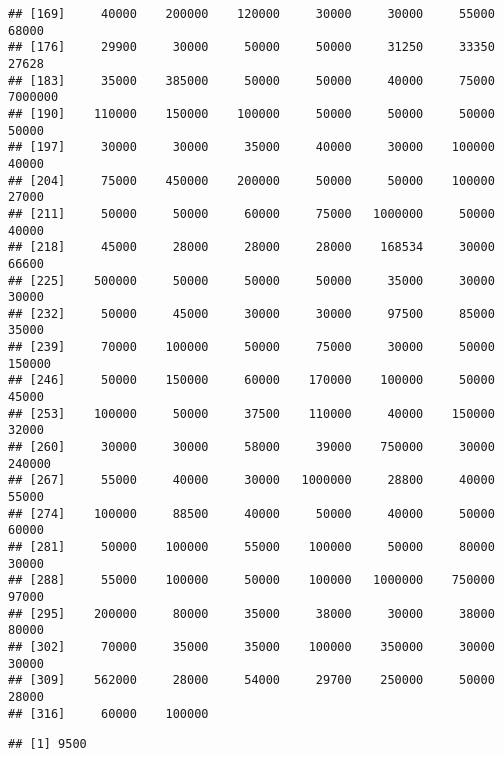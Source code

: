 \documentclass[
]{article}
\newenvironment{Shaded}{\begin{snugshade}}{\end{snugshade}}
\newcommand{\KeywordTok}[1]{\textcolor[rgb]{0.13,0.29,0.53}{\textbf{#1}}}
\newcommand{\NormalTok}[1]{#1}
\newcommand{\OperatorTok}[1]{\textcolor[rgb]{0.81,0.36,0.00}{\textbf{#1}}}
\begin{document}
\begin{verbatim}
## [169]     40000    200000    120000     30000     30000     55000     68000
## [176]     29900     30000     50000     50000     31250     33350     27628
## [183]     35000    385000     50000     50000     40000     75000   7000000
## [190]    110000    150000    100000     50000     50000     50000     50000
## [197]     30000     30000     35000     40000     30000    100000     40000
## [204]     75000    450000    200000     50000     50000    100000     27000
## [211]     50000     50000     60000     75000   1000000     50000     40000
## [218]     45000     28000     28000     28000    168534     30000     66600
## [225]    500000     50000     50000     50000     35000     30000     30000
## [232]     50000     45000     30000     30000     97500     85000     35000
## [239]     70000    100000     50000     75000     30000     50000    150000
## [246]     50000    150000     60000    170000    100000     50000     45000
## [253]    100000     50000     37500    110000     40000    150000     32000
## [260]     30000     30000     58000     39000    750000     30000    240000
## [267]     55000     40000     30000   1000000     28800     40000     55000
## [274]    100000     88500     40000     50000     40000     50000     60000
## [281]     50000    100000     55000    100000     50000     80000     30000
## [288]     55000    100000     50000    100000   1000000    750000     97000
## [295]    200000     80000     35000     38000     30000     38000     80000
## [302]     70000     35000     35000    100000    350000     30000     30000
## [309]    562000     28000     54000     29700    250000     50000     28000
## [316]     60000    100000
\end{verbatim}

\begin{Shaded}
\end{Shaded}

\begin{verbatim}
## [1] 9500
\end{verbatim}

\begin{Shaded}
\end{Shaded}
\end{document}
